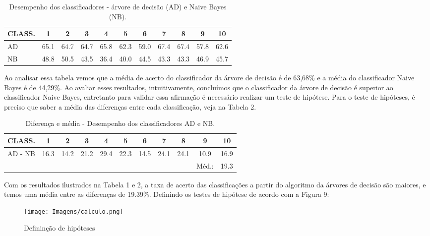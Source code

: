 \documentclass[preprint,12pt,times]{elsarticle}
\begin{document}
	\begin{table}[h]
		\centering
		\begin{tabular}{l c c c c c c c c c c }
			\hline
			\textbf{CLASS.} & \textbf{1} & \textbf{2} & \textbf{3} & \textbf{4} & \textbf{5} & \textbf{6} & \textbf{7} & \textbf{8} & \textbf{9} & \textbf{10}\\
			\hline
			AD & 65.1 & 64.7 & 64.7 & 65.8 & 62.3 & 59.0 & 67.4 & 67.4  & 57.8 & 62.6\\
			NB & 48.8 & 50.5 & 43.5 & 36.4 & 40.0 & 44.5 & 43.3 & 43.3 & 46.9 & 45.7\\
			
			\hline
		\end{tabular}
		\caption{Desempenho dos classificadores - árvore de decisão (AD) e Naive Bayes (NB).}
	\end{table}

	Ao analisar essa tabela vemos que a média de acerto do classificador da árvore de decisão é de 63,68\% e a média do classificador Naive Bayes é de 44,29\%.
	Ao avaliar esses resultados, intuitivamente, concluímos que o classificador da árvore de decisão é superior ao classificador Naive Bayes, entretanto para validar essa afirmação é necessário realizar um teste de hipótese.
	Para o teste de hipóteses, é preciso que saber a média das diferenças entre cada classificação, veja na Tabela 2.
	
		\begin{table}[h]
		\centering
		\begin{tabular}{l c c c c c c c c c c }
			\hline
			\textbf{CLASS.} & \textbf{1} & \textbf{2} & \textbf{3} & \textbf{4} & \textbf{5} & \textbf{6} & \textbf{7} & \textbf{8} & \textbf{9} & \textbf{10}\\
			\hline
			AD - NB & 16.3 & 14.2 & 21.2 & 29.4 & 22.3 & 14.5 & 24.1 & 24.1  & 10.9 & 16.9\\
			\hline
			&&&&&&&&&Méd.: & 19.3\\  		
			\hline
		\end{tabular}
		\caption{Diferença e média - Desempenho dos classificadores AD e NB.}
	\end{table}

	Com os resultados ilustrados na Tabela 1 e 2, a taxa de acerto das classificações a partir do algoritmo da árvores de decisão são maiores, e temos uma média entre as diferenças de 19.39\%.
	Definindo os testes de hipótese de acordo com a Figura 9:
	
	\begin{figure}[h]
		\centering\texttt{[image: Imagens/calculo.png]}
		\caption{Defininção de hipóteses}
	\end{figure}
	
\end{document}
